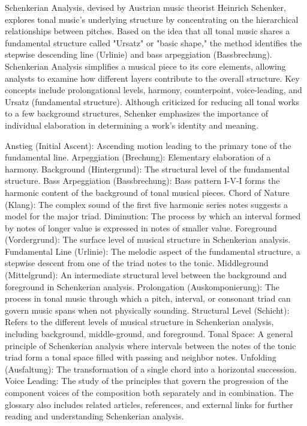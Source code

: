 Schenkerian Analysis, devised by Austrian music theorist Heinrich Schenker, explores tonal music's underlying structure by concentrating on the hierarchical relationships between pitches. Based on the idea that all tonal music shares a fundamental structure called "Ursatz" or "basic shape," the method identifies the stepwise descending line (Urlinie) and bass arpeggiation (Bassbrechung). Schenkerian Analysis simplifies a musical piece to its core elements, allowing analysts to examine how different layers contribute to the overall structure. Key concepts include prolongational levels, harmony, counterpoint, voice-leading, and Ursatz (fundamental structure). Although criticized for reducing all tonal works to a few background structures, Schenker emphasizes the importance of individual elaboration in determining a work's identity and meaning.


Anstieg (Initial Ascent): Ascending motion leading to the primary tone of the fundamental line.
Arpeggiation (Brechung): Elementary elaboration of a harmony.
Background (Hintergrund): The structural level of the fundamental structure.
Bass Arpeggiation (Bassbrechung): Bass pattern I-V-I forms the harmonic content of the background of tonal musical pieces.
Chord of Nature (Klang): The complex sound of the first five harmonic series notes suggests a model for the major triad.
Diminution: The process by which an interval formed by notes of longer value is expressed in notes of smaller value.
Foreground (Vordergrund): The surface level of musical structure in Schenkerian analysis.
Fundamental Line (Urlinie): The melodic aspect of the fundamental structure, a stepwise descent from one of the triad notes to the tonic.
Middleground (Mittelgrund): An intermediate structural level between the background and foreground in Schenkerian analysis.
Prolongation (Auskomponierung): The process in tonal music through which a pitch, interval, or consonant triad can govern music spans when not physically sounding.
Structural Level (Schicht): Refers to the different levels of musical structure in Schenkerian analysis, including background, middle-ground, and foreground.
Tonal Space: A general principle of Schenkerian analysis where intervals between the notes of the tonic triad form a tonal space filled with passing and neighbor notes.
Unfolding (Ausfaltung): The transformation of a single chord into a horizontal succession.
Voice Leading: The study of the principles that govern the progression of the component voices of the composition both separately and in combination.
The glossary also includes related articles, references, and external links for further reading and understanding Schenkerian analysis.

